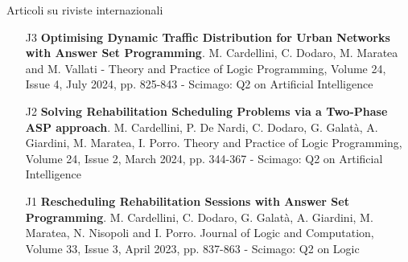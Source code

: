 \documentclass{resume} %
\begin{document}
\begin{rSection}{Articoli su riviste internazionali}
\begin{enumerate}[leftmargin=5mm]
	\item[J3] \textbf{Optimising Dynamic Traffic Distribution for Urban Networks with Answer Set Programming}. M. Cardellini, C. Dodaro, M. Maratea and M. Vallati - Theory and Practice of Logic Programming,  Volume 24, Issue 4, July 2024, pp. 825-843 - Scimago: Q2 on Artificial Intelligence
	\item[J2] \textbf{Solving Rehabilitation Scheduling Problems via a Two-Phase ASP approach}. M. Cardellini, P. De Nardi, C. Dodaro, G. Galat\`a, A. Giardini, M. Maratea, I. Porro. Theory and Practice of Logic Programming, Volume 24, Issue 2, March 2024, pp. 344-367 - Scimago: Q2 on Artificial Intelligence
	\item[J1] \textbf{Rescheduling Rehabilitation Sessions with Answer Set Programming}. M. Cardellini, C. Dodaro, G. Galat\`a, A. Giardini, M. Maratea, N. Nisopoli and I. Porro. Journal of Logic and Computation, Volume 33, Issue 3, April 2023, pp. 837-863 - Scimago: Q2 on Logic
\end{enumerate}
\end{rSection}
 
\end{document}
